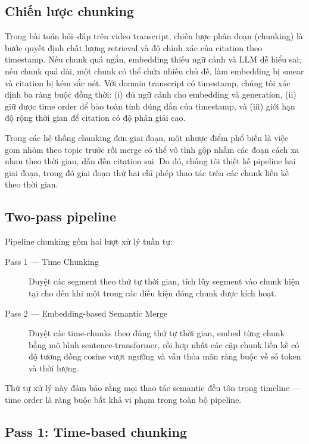 \subsection{Chiến lược chunking}
\label{sec:chunking-strategy}

Trong bài toán hỏi--đáp trên video transcript, chiến lược phân đoạn (chunking) là bước quyết định chất lượng retrieval và độ chính xác của citation theo timestamp. Nếu chunk quá ngắn, embedding thiếu ngữ cảnh và LLM dễ hiểu sai; nếu chunk quá dài, một chunk có thể chứa nhiều chủ đề, làm embedding bị smear và citation bị kém sắc nét. Với domain transcript có timestamp, chúng tôi xác định ba ràng buộc đồng thời: (i) đủ ngữ cảnh cho embedding và generation, (ii) giữ được time order để bảo toàn tính đúng đắn của timestamp, và (iii) giới hạn độ rộng thời gian để citation có độ phân giải cao.

Trong các hệ thống chunking đơn giai đoạn, một nhược điểm phổ biến là việc gom nhóm theo topic trước rồi merge có thể vô tình gộp nhầm các đoạn cách xa nhau theo thời gian, dẫn đến citation sai. Do đó, chúng tôi thiết kế pipeline hai giai đoạn, trong đó giai đoạn thứ hai chỉ phép thao tác trên các chunk liền kề theo thời gian.

\subsection{Two-pass pipeline}

Pipeline chunking gồm hai lượt xử lý tuần tự:

\begin{description}
\item[Pass 1 — Time Chunking] Duyệt các segment theo thứ tự thời gian, tích lũy segment vào chunk hiện tại cho đến khi một trong các điều kiện đóng chunk được kích hoạt.

\item[Pass 2 — Embedding-based Semantic Merge] Duyệt các time-chunks theo đúng thứ tự thời gian, embed từng chunk bằng mô hình sentence-transformer, rồi hợp nhất các cặp chunk liền kề có độ tương đồng cosine vượt ngưỡng và vẫn thỏa mãn ràng buộc về số token và thời lượng.
\end{description}

Thứ tự xử lý này đảm bảo rằng mọi thao tác semantic đều tôn trọng timeline — time order là ràng buộc bất khả vi phạm trong toàn bộ pipeline.

\subsection{Pass 1: Time-based chunking}
\label{subsubsec:time-chunking}

